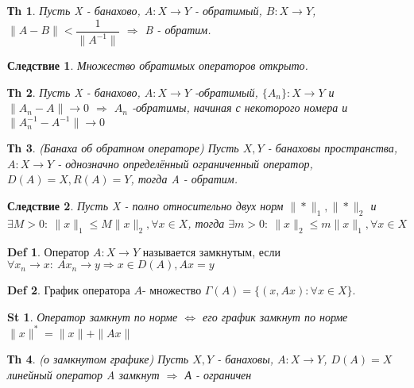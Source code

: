 \documentclass[14pt]{article}
\theoremstyle{plain}
\newtheorem{Thm}{Тh}
\newtheorem{St}{St}
\newtheorem{Sled}{Следствие}
\theoremstyle{definition}
\newtheorem{Def}{Def}
\begin{document}
 		\begin{Thm}
 			Пусть X - банахово, $A:X\to Y$ - обратимый, $B:X\to Y$, $\|A - B\| < \dfrac{1}{\|A^{-1}\|} $ $\Rightarrow$ B - обратим. 
 		\end{Thm}
 		\begin{Sled}
 			Множество обратимых операторов открыто. 
 		\end{Sled}
 		\begin{Thm}
 			Пусть X - банахово, $A: X \to Y$ -обратимый, $\{A_n\}: X \to Y$ и $\|A_n - A\| \to 0$ $\Rightarrow$ $A_n$ -обратимы, начиная с некоторого номера и $\|A_n^{-1} - A^{-1}\| \to 0$
 		\end{Thm}
 		\begin{Thm}
 			(Банаха об обратном операторе)\newline
 			Пусть $X, Y$ - банаховы пространства, $A: X\to Y$ - однозначно определённый ограниченный оператор, $D(A) = X, R(A) = Y$, тогда A - обратим. 
 		\end{Thm}
 		\begin{Sled}
 			Пусть X - полно относительно двух норм $\|*\|_1, \|*\|_2$ и $\exists M > 0: \ \|x\|_1 \leq M\|x\|_2, \forall x \in X$, тогда $\exists m> 0: \ \|x\|_2 \leq m\|x\|_1, \forall x \in X$
 		\end{Sled}
 		\begin{Def}
 			Оператор $A:X \to Y$ называется замкнутым, если $\forall x_n \to x: \ Ax_n \to y \Rightarrow x \in D(A), Ax = y$
 		\end{Def}
 		\begin{Def}
 			График оператора $A$- множество	$\Gamma(A) = \{(x,Ax): \forall x \in X\}$.
 		\end{Def}
 		\begin{St}
 			Оператор замкнут по норме $\Leftrightarrow$ его график замкнут по норме $\|x\|^{*} = \|x\| + \|Ax\|$
 		\end{St}
 		\begin{Thm}
 			(о замкнутом графике)\newline
 			Пусть $X, Y$ - банаховы, $A:X\to Y$, $D(A) = X$ линейный оператор A замкнут $\Rightarrow$ А - ограничен
 		\end{Thm}
\end{document}
